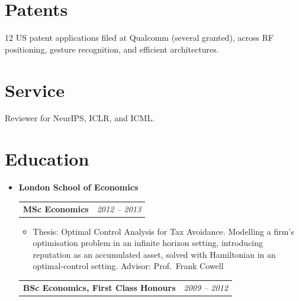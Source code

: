 \documentclass[letterpaper,11pt]{article}
\makeatletter
\newcommand{\cvcompany}[1]{
  \vspace{2pt}\item \textbf{#1} \\[1pt]
}
\newcommand{\cvrole}[2]{
    \begin{tabular*}{0.97\textwidth}[t]{l@{\extracolsep{\fill}}r}
      \textbf{#1} & \textit{\small #2} \\
    \end{tabular*}\vspace{-7pt}
}
\makeatother
\begin{document}
\section{Patents}
\small{
12 US patent applications filed at Qualcomm (several granted), across RF positioning, gesture recognition, and efficient architectures.
}

\section{Service}
\small{
Reviewer for NeurIPS, ICLR, and ICML.
}

\section{Education}
  \begin{itemize}[leftmargin=0.15in, label={}]
    \cvcompany{London School of Economics}
      \cvrole{MSc Economics}{2012 -- 2013}
      \begin{itemize}
        \item Thesis: Optimal Control Analysis for Tax Avoidance. Modelling a firm's optimisation problem in an infinite horizon setting, introducing reputation as an accumulated asset, solved with Hamiltonian in an optimal-control setting. Advisor: Prof.\ Frank Cowell
      \end{itemize}
      \cvrole{BSc Economics, First Class Honours}{2009 -- 2012}
  \end{itemize}
\end{document}
